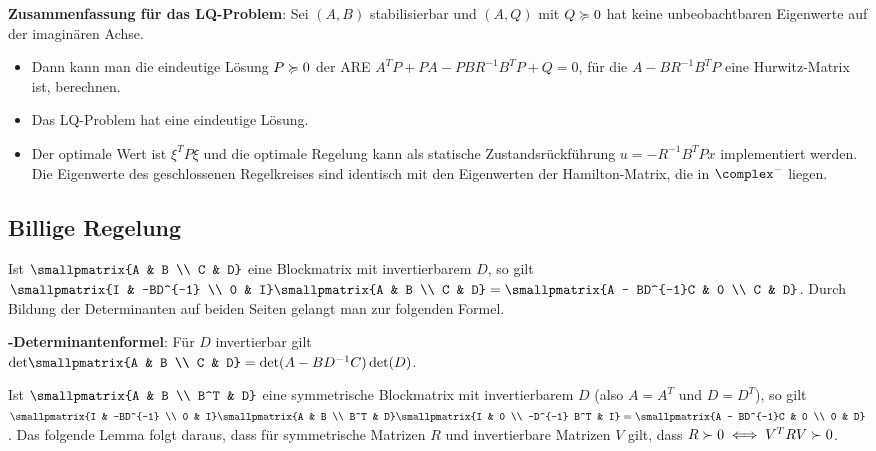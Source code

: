 \textbf{Zusammenfassung für das LQ-Problem}:
Sei $(A, B)$ stabilisierbar und $(A, Q)$ mit $Q \succcurlyeq 0$ hat keine
unbeobachtbaren Eigenwerte auf der imaginären Achse.
\begin{itemize}
    \item
    Dann kann man die eindeutige Lösung $P \succcurlyeq 0$ der ARE
    $A^T P + PA - PBR^{-1} B^T P + Q = 0$,
    für die $A - BR^{-1} B^T P$ eine Hurwitz-Matrix ist, berechnen.
    
    \item
    Das LQ-Problem hat eine eindeutige Lösung.
    
    \item
    Der optimale Wert ist $\xi^T P \xi$ und die optimale Regelung kann als statische
    Zustandsrückführung $u = -R^{-1} B^T Px$ implementiert werden.
    Die Eigenwerte des geschlossenen Regelkreises sind identisch mit den Eigenwerten
    der Hamilton-Matrix, die in $\complex^-$ liegen.
\end{itemize}

\pagebreak

\subsection{%
    Billige Regelung%
}

Ist $\smallpmatrix{A & B \\ C & D}$ eine Blockmatrix mit invertierbarem $D$,
so gilt
$\smallpmatrix{I & -BD^{-1} \\ 0 & I} \smallpmatrix{A & B \\ C & D} =
\smallpmatrix{A - BD^{-1}C & 0 \\ C & D}$.
Durch Bildung der Determinanten auf beiden Seiten gelangt man zur folgenden Formel.

\textbf{-Determinantenformel}:
Für $D$ invertierbar gilt\\
$\det\!\smallpmatrix{A & B \\ C & D} = \det(A - BD^{-1}C) \det(D)$.

Ist $\smallpmatrix{A & B \\ B^T & D}$ eine symmetrische Blockmatrix mit invertierbarem $D$
(also $A = A^T$ und $D = D^T$), so gilt
$\smallpmatrix{I & -BD^{-1} \\ 0 & I} \smallpmatrix{A & B \\ B^T & D}
\smallpmatrix{I & 0 \\ -D^{-1} B^T & I} = \smallpmatrix{A - BD^{-1}C & 0 \\ 0 & D}$.
Das folgende Lemma folgt daraus, dass für symmetrische Matrizen $R$ und
invertierbare Matrizen $V$ gilt, dass $R \succ 0 \iff V^T RV \succ 0$.

